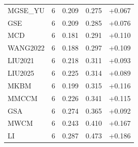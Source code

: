 \begin{tabular}{lrrrr}
MGSE_YU & 6 & 0.209 & 0.275 & +0.067 \\
GSE & 6 & 0.209 & 0.285 & +0.076 \\
MCD & 6 & 0.181 & 0.291 & +0.110 \\
WANG2022 & 6 & 0.188 & 0.297 & +0.109 \\
LIU2021 & 6 & 0.218 & 0.311 & +0.093 \\
LIU2025 & 6 & 0.225 & 0.314 & +0.089 \\
MKBM & 6 & 0.199 & 0.315 & +0.116 \\
MMCCM & 6 & 0.226 & 0.341 & +0.115 \\
GSA & 6 & 0.274 & 0.365 & +0.092 \\
MWCM & 6 & 0.243 & 0.410 & +0.167 \\
LI & 6 & 0.287 & 0.473 & +0.186 \\
\hline
\end{tabular}
